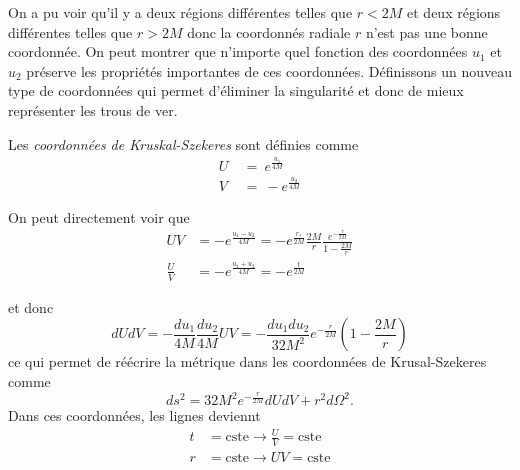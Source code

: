 \documentclass[a4paper,11pt]{report}
\begin{document}
            On a pu voir qu'il y a deux régions différentes telles que $r<2M$ et deux régions différentes telles que $r>2M$ donc la coordonnés radiale $r$ n'est pas une bonne coordonnée. On peut montrer que n'importe quel fonction des coordonnées $u_1$ et $u_2$ préserve les propriétés importantes de ces coordonnées. Définissons un nouveau type de coordonnées qui permet d'éliminer la singularité et donc de mieux représenter les trous de ver.
            
            \begin{definition}
                Les \textit{coordonnées de Kruskal-Szekeres} sont définies comme
                \begin{align}
                    U ~&\hat{=}~ e^{\frac{u_1}{4M}}\\
                    V ~&\hat{=}~ -e^{\frac{u_2}{4M}}
                \end{align}
            \end{definition}
            
            On peut directement voir que 
            \begin{align}
                UV &= -e^{\frac{u_1-u_2}{4M}} = -e^{\frac{r_*}{2M}}\frac{2M}{r}\frac{e^{-\frac{r}{2M}}}{1-\frac{2M}{r}}\\
                \frac{U}{V} &= -e^{\frac{u_1+u_2}{4M}} = -e^{\frac{t}{2M}}
            \end{align}
            
            et donc
            \begin{equation}
                dUdV = -\frac{du_1}{4M}\frac{du_2}{4M}UV = -\frac{du_1du_2}{32M^2}e^{-\frac{r}{2M}}\left( 1-\frac{2M}{r} \right)
            \end{equation}
            ce qui permet de réécrire la métrique dans les coordonnées de Krusal-Szekeres comme
            \begin{equation}
                ds^2 = 32M^2e^{-\frac{r}{2M}}dUdV+r^2d\Omega^2.
            \end{equation}
            Dans ces coordonnées, les lignes deviennt
            \begin{align}
                t &= \text{cste} \to \frac{U}{V} = \text{cste}\\
                r &= \text{cste} \to UV = \text{cste}
            \end{align}
            
            
\end{document}
